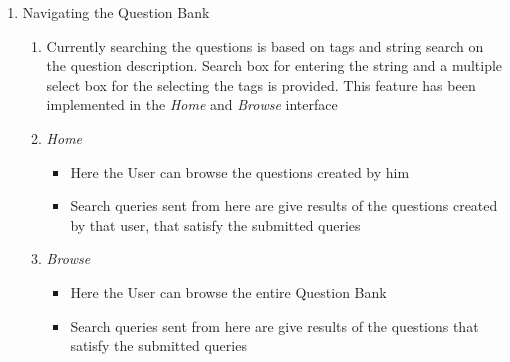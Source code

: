\documentclass[a4paper,12pt,oneside]{book}
\begin{document}
\begin{enumerate}
        \item Navigating the Question Bank 
            \begin{enumerate}
                \item Currently searching the questions is based on tags and string search on the question description. Search box for entering the string and a multiple select box for the selecting the tags is provided. This feature has been implemented in the \textit{Home} and \textit{Browse} interface
                
                \item \textit{Home}
                    \begin{itemize}
                      \item Here the User can browse the questions created by him 
                      \item Search queries sent from here are give results of the questions created by that user, that satisfy the submitted queries
                    \end{itemize}
                    
                \item \textit{Browse}
                    \begin{itemize}
                      \item Here the User can browse the entire Question Bank  
                      \item Search queries sent from here are give results of the questions that satisfy the submitted queries
                    \end{itemize}
            \end{enumerate}
            

\end{enumerate}
\end{document}
